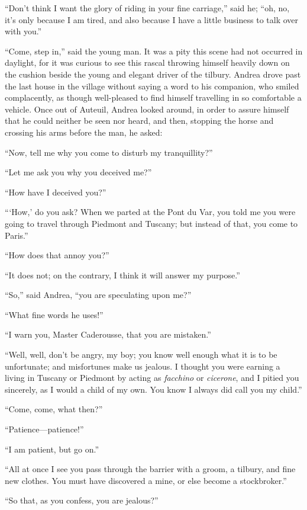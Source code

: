 “Don’t think I want the glory of riding in your fine carriage,” said
he; “oh, no, it’s only because I am tired, and also because I have a
little business to talk over with you.”

“Come, step in,” said the young man. It was a pity this scene had not
occurred in daylight, for it was curious to see this rascal throwing
himself heavily down on the cushion beside the young and elegant driver
of the tilbury. Andrea drove past the last house in the village without
saying a word to his companion, who smiled complacently, as though
well-pleased to find himself travelling in so comfortable a vehicle.
Once out of Auteuil, Andrea looked around, in order to assure himself
that he could neither be seen nor heard, and then, stopping the horse
and crossing his arms before the man, he asked:

“Now, tell me why you come to disturb my tranquillity?”

“Let me ask you why you deceived me?”

“How have I deceived you?”

“‘How,’ do you ask? When we parted at the Pont du Var, you told me you
were going to travel through Piedmont and Tuscany; but instead of that,
you come to Paris.”

“How does that annoy you?”

“It does not; on the contrary, I think it will answer my purpose.”

“So,” said Andrea, “you are speculating upon me?”

“What fine words he uses!”

“I warn you, Master Caderousse, that you are mistaken.”

“Well, well, don’t be angry, my boy; you know well enough what it is to
be unfortunate; and misfortunes make us jealous. I thought you were
earning a living in Tuscany or Piedmont by acting as \textit{facchino} or
\textit{cicerone}, and I pitied you sincerely, as I would a child of my own.
You know I always did call you my child.”

“Come, come, what then?”

“Patience—patience!”

“I am patient, but go on.”

“All at once I see you pass through the barrier with a groom, a
tilbury, and fine new clothes. You must have discovered a mine, or else
become a stockbroker.”

“So that, as you confess, you are jealous?”


